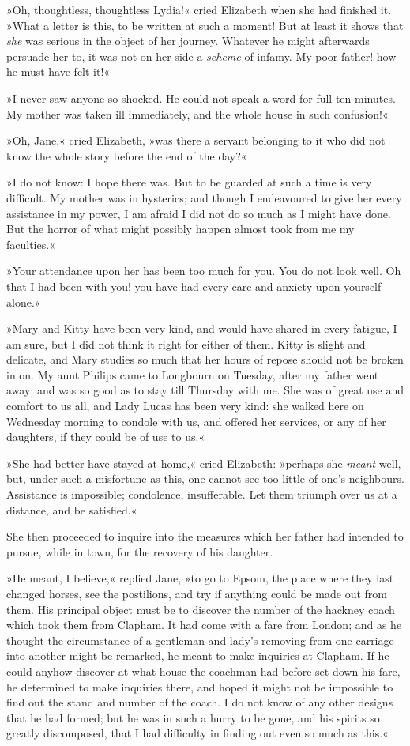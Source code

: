 »Oh, thoughtless, thoughtless Lydia!« cried Elizabeth when she had finished it. »What a letter is this, to be written at such a moment! But at least it shows that \textit{she} was serious in the object of her journey. Whatever he might afterwards persuade her to, it was not on her side a \textit{scheme} of infamy. My poor father! how he must have felt it!«

»I never saw anyone so shocked. He could not speak a word for full ten minutes. My mother was taken ill immediately, and the whole house in such confusion!«

»Oh, Jane,« cried Elizabeth, »was there a servant belonging to it who did not know the whole story before the end of the day?«

»I do not know: I hope there was. But to be guarded at such a time is very difficult. My mother was in hysterics; and though I endeavoured to give her every assistance in my power, I am afraid I did not do so much as I might have done. But the horror of what might possibly happen almost took from me my faculties.«

»Your attendance upon her has been too much for you. You do not look well. Oh that I had been with you! you have had every care and anxiety upon yourself alone.«

»Mary and Kitty have been very kind, and would have shared in every fatigue, I am sure, but I did not think it right for either of them. Kitty is slight and delicate, and Mary studies so much that her hours of repose should not be broken in on. My aunt Philips came to Longbourn on Tuesday, after my father went away; and was so good as to stay till Thursday with me. She was of great use and comfort to us all, and Lady Lucas has been very kind: she walked here on Wednesday morning to condole with us, and offered her services, or any of her daughters, if they could be of use to us.«

»She had better have stayed at home,« cried Elizabeth: »perhaps she \textit{meant} well, but, under such a misfortune as this, one cannot see too little of one's neighbours. Assistance is impossible; condolence, insufferable. Let them triumph over us at a distance, and be satisfied.«

She then proceeded to inquire into the measures which her father had intended to pursue, while in town, for the recovery of his daughter.

»He meant, I believe,« replied Jane, »to go to Epsom, the place where they last changed horses, see the postilions, and try if anything could be made out from them. His principal object must be to discover the number of the hackney coach which took them from Clapham. It had come with a fare from London; and as he thought the circumstance of a gentleman and lady's removing from one carriage into another might be remarked, he meant to make inquiries at Clapham. If he could anyhow discover at what house the coachman had before set down his fare, he determined to make inquiries there, and hoped it might not be impossible to find out the stand and number of the coach. I do not know of any other designs that he had formed; but he was in such a hurry to be gone, and his spirits so greatly discomposed, that I had difficulty in finding out even so much as this.«